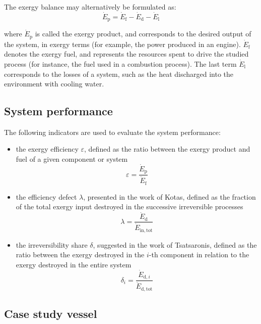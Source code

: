 \documentclass[preprint,12pt]{elsarticle}
\begin{document}
The exergy balance may alternatively be formulated as:
\begin{equation}
\dot{E}_{\mathrm{p}} = \dot{E}_{\mathrm{f}} - \dot{E}_{\mathrm{d}} - \dot{E}_{\mathrm{l}} 
\end{equation}

where $\dot{E}_{\mathrm{p}}$ is called the exergy product, and corresponds to the desired output of the system, in exergy terms (for example, the power produced in an engine). $\dot{E}_{\mathrm{f}}$ denotes the exergy fuel, and represents the resources spent to drive the studied process (for instance, the fuel used in a combustion process). The last term $\dot{E}_{\mathrm{l}}$ corresponds to the losses of a system, such as the heat discharged into the environment with cooling water. 

\subsection{System performance}

The following indicators are used to evaluate the system performance:
\begin{itemize}
	\item the exergy efficiency $\varepsilon$, defined as the ratio between the exergy product and fuel of a given component or system
	\begin{equation} \varepsilon = \frac{\dot{E}_{\mathrm{p}}}{\dot{E}_{\mathrm{f}}} \end{equation}
	\item the efficiency defect $\lambda$, presented in the work of Kotas, defined as the fraction of the total exergy input destroyed in the successive irreversible processes
	\begin{equation} \lambda = \frac{\dot{E}_{\mathrm{d}}}{\dot{E}_{\mathrm{in,tot}}} \end{equation}
	\item  the irreversibility share $\delta$, suggested in the work of Tsatsaronis, defined as the ratio between the exergy destroyed in the $i$-th component in relation to the exergy destroyed in the entire system
	\begin{equation} \delta_i = \frac{\dot{E}_{\mathrm{d},i}}{\dot{E}_{\mathrm{d,tot}}} \end{equation}
	
\end{itemize}    


\subsection{Case study vessel} \label{sec:met:case}
\end{document}
